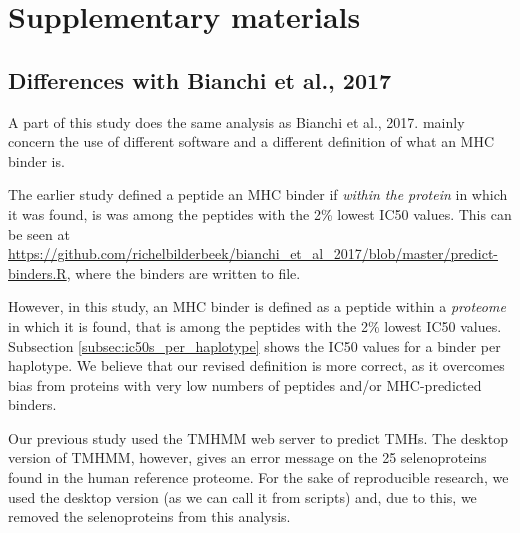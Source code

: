 \section{Supplementary materials}

\subsection{Differences with Bianchi et al., 2017}

A part of this study does the same analysis as Bianchi et al., 2017.
mainly concern the use of different
software and a different definition of what an MHC binder is.


The earlier study defined a peptide an MHC binder 
if \emph{within the protein} in which it was found, 
is was among the peptides with the 2\% lowest IC50 values.
This can be seen at \url{https://github.com/richelbilderbeek/bianchi_et_al_2017/blob/master/predict-binders.R},
where the binders are written to file.

However, in this study, an MHC binder is defined as a peptide within a \emph{proteome} in which it is found, that is among the peptides with the 2\% lowest IC50 values.
Subsection \ref{subsec:ic50s_per_haplotype} shows the IC50 values
for a binder per haplotype. We believe that our revised definition is more correct, as it overcomes bias from proteins with very low numbers of peptides and/or MHC-predicted binders.


Our previous study used the TMHMM web server
to predict TMHs.
The desktop version of TMHMM, however, gives an
error message on the 25 selenoproteins found in the human
reference proteome.
For the sake of reproducible research, we used the desktop version (as
we can call it from scripts) and, due to this, we removed the
selenoproteins from this analysis.

